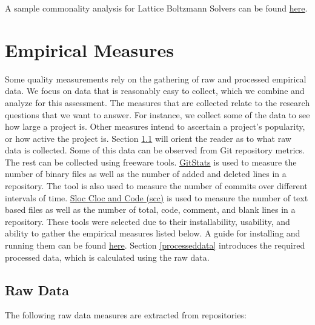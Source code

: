 \documentclass[letterpaper,cleveref]{lipics-v2019}
\theoremstyle{definition}
\begin{document}
A sample commonality analysis for Lattice Boltzmann Solvers can be found
\href{https://github.com/smiths/AIMSS/blob/master/StateOfPractice/Peter-Notes/Commonality-Analysis-LB-Systems.pdf}{here}.

\section{Empirical Measures} \label{SecEmpiricalMeasures}
Some quality measurements rely on the gathering of raw and processed empirical data. We focus on data that is reasonably easy to collect, which we combine and analyze for this assessment. The measures that are collected relate to the research questions that we want to answer. For instance, we collect some of the data to see how large a project is. Other measures intend to ascertain a project’s popularity, or how active the project is.
Section \ref{rawdata} will orient the reader as to what raw data is collected. 
Some of this data can be observed from Git repository metrics. The rest can be collected using freeware tools. \href{https://github.com/tomgi/git_stats}{GitStats} is used to measure the number of binary files as well as the number of added and deleted lines in a repository. The tool is also used to measure the number of commits over different intervals of time. \href{https://github.com/boyter/scc}{Sloc Cloc and Code (scc)} is used to measure the number of text based files as well as the number of total, code, comment, and blank lines in a repository. These tools were selected due to their installability, usability, and ability to gather the empirical measures listed below. A guide for installing and running them can be found \href{run:A Guide to Empirical Measures.pdf}{here}. Section \ref{processeddata} introduces the required processed data, which is calculated using the raw data.

\subsection{Raw Data}\label{rawdata}
The following raw data measures are extracted from repositories:
\end{document}

